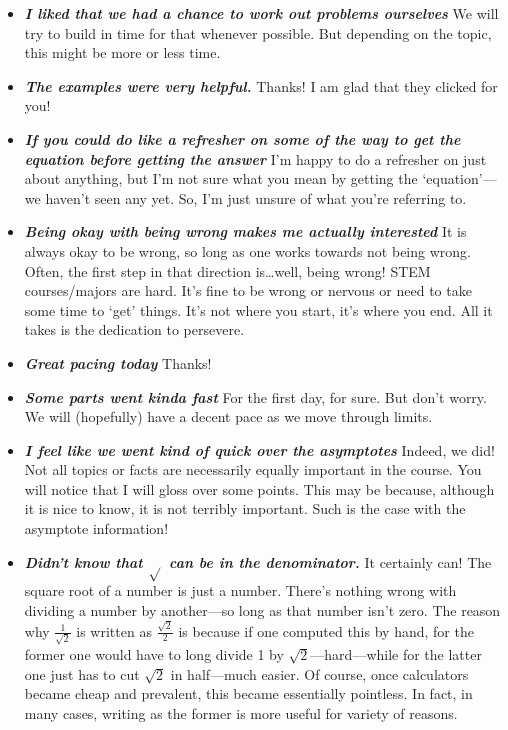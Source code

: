 \documentclass[11pt,letterpaper]{article}
\begin{document}
\begin{itemize}
\item {\bfseries\itshape I liked that we had a chance to work out problems ourselves} We will try to build in time for that whenever possible. But depending on the topic, this might be more or less time. 

\item {\bfseries\itshape The examples were very helpful.} Thanks! I am glad that they clicked for you!

\item {\bfseries\itshape If you could do like a refresher on some of the way to get the equation before getting the answer} I'm happy to do a refresher on just about anything, but I'm not sure what you mean by getting the `equation'---we haven't seen any yet. So, I'm just unsure of what you're referring to. 

\item {\bfseries\itshape Being okay with being wrong makes me actually interested} It is always okay to be wrong, so long as one works towards not being wrong. Often, the first step in that direction is\dots well, being wrong! STEM courses/majors are hard. It's fine to be wrong or nervous or need to take some time to `get' things. It's not where you start, it's where you end. All it takes is the dedication to persevere. 

\item {\bfseries\itshape Great pacing today} Thanks!

\item {\bfseries\itshape Some parts went kinda fast} For the first day, for sure. But don't worry. We will (hopefully) have a decent pace as we move through limits. 

\item {\bfseries\itshape I feel like we went kind of quick over the asymptotes} Indeed, we did! Not all topics or facts are necessarily equally important in the course. You will notice that I will gloss over some points. This may be because, although it is nice to know, it is not terribly important. Such is the case with the asymptote information! 

\item {\bfseries\itshape Didn't know that $\sqrt{}$ can be in the denominator.} It certainly can! The square root of a number is just a number. There's nothing wrong with dividing a number by another---so long as that number isn't zero. The reason why $\tfrac{1}{\sqrt{2}}$ is written as $\tfrac{\sqrt{2}}{2}$ is because if one computed this by hand, for the former one would have to long divide 1 by $\sqrt{2}$---hard---while for the latter one just has to cut $\sqrt{2}$ in half---much easier. Of course, once calculators became cheap and prevalent, this became essentially pointless. In fact, in many cases, writing as the former is more useful for variety of reasons.  


\end{itemize}
\end{document}
